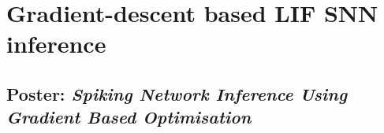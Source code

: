 \documentclass[mphil,deptreport,ianc]{infthesis} %
\begin{document}







\chapter{Gradient-descent based LIF SNN inference}
\section{Poster: \textit{Spiking Network Inference Using Gradient Based Optimisation}}

\end{document}

